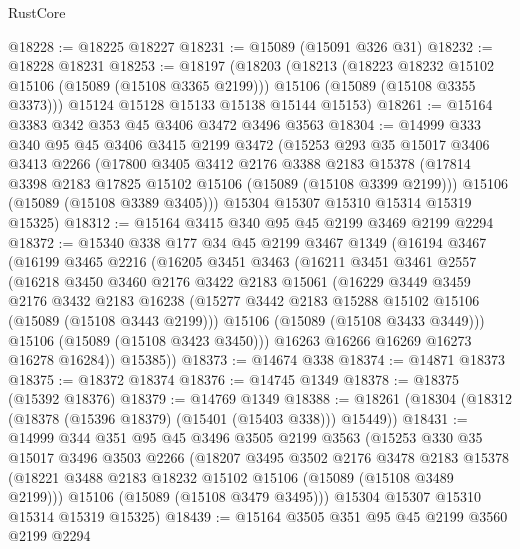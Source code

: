 \begin{lexlean}{RustCore}
\begin{coremodule}
@18228 := @18225 @18227
@18231 := @15089 (@15091 @326 @31)
@18232 := @18228 @18231
@18253 := @18197
    (@18203
      (@18213
        (@18223 @18232 @15102 @15106 (@15089 (@15108 @3365 @2199)))
        @15106
        (@15089 (@15108 @3355 @3373)))
      @15124
      @15128
      @15133
      @15138
      @15144
      @15153)
@18261 := @15164 @3383 @342 @353 @45 @3406 @3472 @3496 @3563
@18304 := @14999
    @333
    @340
    @95
    @45
    @3406
    @3415
    @2199
    @3472
    (@15253
      @293
      @35
      @15017
      @3406
      @3413
      @2266
      (@17800
        @3405
        @3412
        @2176
        @3388
        @2183
        @15378
        (@17814 @3398 @2183 @17825 @15102 @15106 (@15089 (@15108 @3399 @2199)))
        @15106
        (@15089 (@15108 @3389 @3405)))
      @15304
      @15307
      @15310
      @15314
      @15319
      @15325)
@18312 := @15164 @3415 @340 @95 @45 @2199 @3469 @2199 @2294
@18372 := @15340
    @338
    @177
    @34
    @45
    @2199
    @3467
    @1349
    (@16194
      @3467
      (@16199
        @3465
        @2216
        (@16205
          @3451
          @3463
          (@16211
            @3451
            @3461
            @2557
            (@16218
              @3450
              @3460
              @2176
              @3422
              @2183
              @15061
              (@16229
                @3449
                @3459
                @2176
                @3432
                @2183
                @16238
                (@15277 @3442 @2183 @15288 @15102 @15106 (@15089 (@15108 @3443 @2199)))
                @15106
                (@15089 (@15108 @3433 @3449)))
              @15106
              (@15089 (@15108 @3423 @3450)))
            @16263
            @16266
            @16269
            @16273
            @16278
            @16284))
        @15385))
@18373 := @14674 @338
@18374 := @14871 @18373
@18375 := @18372 @18374
@18376 := @14745 @1349
@18378 := @18375 (@15392 @18376)
@18379 := @14769 @1349
@18388 := @18261 (@18304 (@18312 (@18378 (@15396 @18379) (@15401 (@15403 @338))) @15449))
@18431 := @14999
    @344
    @351
    @95
    @45
    @3496
    @3505
    @2199
    @3563
    (@15253
      @330
      @35
      @15017
      @3496
      @3503
      @2266
      (@18207
        @3495
        @3502
        @2176
        @3478
        @2183
        @15378
        (@18221 @3488 @2183 @18232 @15102 @15106 (@15089 (@15108 @3489 @2199)))
        @15106
        (@15089 (@15108 @3479 @3495)))
      @15304
      @15307
      @15310
      @15314
      @15319
      @15325)
@18439 := @15164 @3505 @351 @95 @45 @2199 @3560 @2199 @2294

\end{coremodule}
\end{lexlean}
